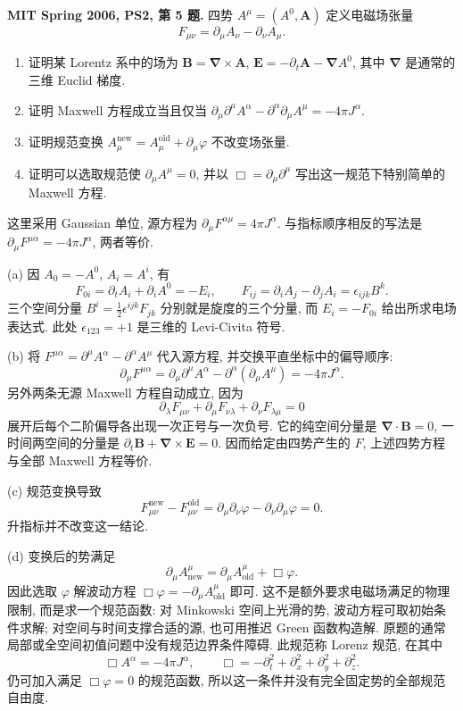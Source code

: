 \begin{exercise}
\textbf{MIT Spring 2006, PS2, 第 5 题.} 四势 $A^\mu=(A^0,\boldsymbol A)$ 定义电磁场张量
\[
 F_{\mu\nu}=\partial_\mu A_\nu-\partial_\nu A_\mu.
\]
\begin{enumerate}[label=(\alph*)]
\item 证明某 Lorentz 系中的场为 $\boldsymbol B=\boldsymbol\nabla\times\boldsymbol A$, $\boldsymbol E=-\partial_t\boldsymbol A-\boldsymbol\nabla A^0$, 其中 $\boldsymbol\nabla$ 是通常的三维 Euclid 梯度.
\item 证明 Maxwell 方程成立当且仅当
 $\partial_\mu\partial^\mu A^\alpha-\partial^\alpha\partial_\mu A^\mu=-4\pi J^\alpha$.
\item 证明规范变换 $A_\mu^{\mathrm{new}}=A_\mu^{\mathrm{old}}+\partial_\mu\varphi$ 不改变场张量.
\item 证明可以选取规范使 $\partial_\mu A^\mu=0$, 并以 $\Box=\partial_\mu\partial^\mu$ 写出这一规范下特别简单的 Maxwell 方程.
\end{enumerate}
\end{exercise}
\begin{solution}
这里采用 Gaussian 单位, 源方程为 $\partial_\mu F^{\alpha\mu}=4\pi J^\alpha$. 与指标顺序相反的写法是 $\partial_\mu F^{\mu\alpha}=-4\pi J^\alpha$, 两者等价.

(a) 因 $A_0=-A^0$, $A_i=A^i$, 有
\[
 F_{0i}=\partial_tA_i+\partial_iA^0=-E_i,
 \qquad F_{ij}=\partial_iA_j-\partial_jA_i=\epsilon_{ijk}B^k.
\]
三个空间分量 $B^i=\tfrac12\epsilon^{ijk}F_{jk}$ 分别就是旋度的三个分量, 而 $E_i=-F_{0i}$ 给出所求电场表达式. 此处 $\epsilon_{123}=+1$ 是三维的 Levi-Civita 符号.

(b) 将 $F^{\mu\alpha}=\partial^\mu A^\alpha-\partial^\alpha A^\mu$ 代入源方程, 并交换平直坐标中的偏导顺序:
\[
 \partial_\mu F^{\mu\alpha}
 =\partial_\mu\partial^\mu A^\alpha
 -\partial^\alpha(\partial_\mu A^\mu)=-4\pi J^\alpha.
\]
另外两条无源 Maxwell 方程自动成立, 因为
\[
 \partial_\lambda F_{\mu\nu}+\partial_\mu F_{\nu\lambda}
 +\partial_\nu F_{\lambda\mu}=0
\]
展开后每个二阶偏导各出现一次正号与一次负号. 它的纯空间分量是 $\boldsymbol\nabla\cdot\boldsymbol B=0$, 一时间两空间的分量是 $\partial_t\boldsymbol B+\boldsymbol\nabla\times\boldsymbol E=0$. 因而给定由四势产生的 $F$, 上述四势方程与全部 Maxwell 方程等价.

(c) 规范变换导致
\[
 F_{\mu\nu}^{\mathrm{new}}-F_{\mu\nu}^{\mathrm{old}}
 =\partial_\mu\partial_\nu\varphi-\partial_\nu\partial_\mu\varphi=0.
\]
升指标并不改变这一结论.

(d) 变换后的势满足
\[
 \partial_\mu A_{\mathrm{new}}^\mu
 =\partial_\mu A_{\mathrm{old}}^\mu+\Box\varphi.
\]
因此选取 $\varphi$ 解波动方程 $\Box\varphi=-\partial_\mu A_{\mathrm{old}}^\mu$ 即可. 这不是额外要求电磁场满足的物理限制, 而是求一个规范函数: 对 Minkowski 空间上光滑的势, 波动方程可取初始条件求解; 对空间与时间支撑合适的源, 也可用推迟 Green 函数构造解. 原题的通常局部或全空间初值问题中没有规范边界条件障碍. 此规范称 Lorenz 规范, 在其中
\[
 \Box A^\alpha=-4\pi J^\alpha,\qquad
 \Box=-\partial_t^2+\partial_x^2+\partial_y^2+\partial_z^2.
\]
仍可加入满足 $\Box\varphi=0$ 的规范函数, 所以这一条件并没有完全固定势的全部规范自由度.
\end{solution}

